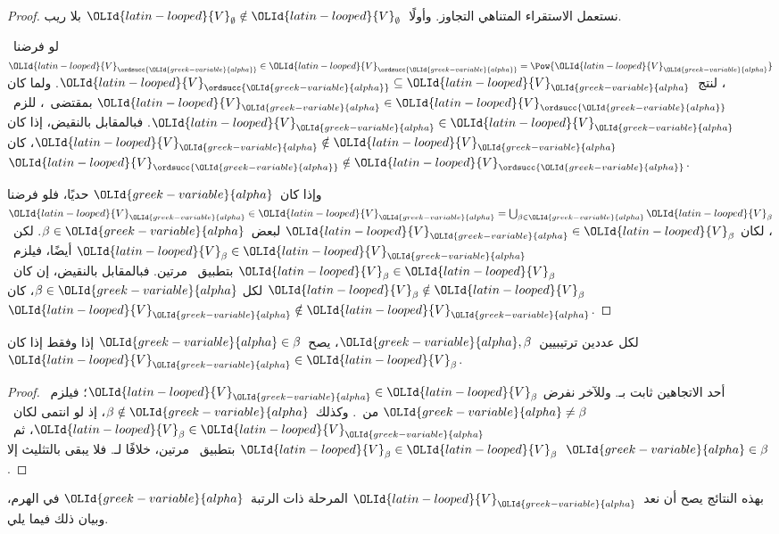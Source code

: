 \documentclass[../../../include/open-logic-section]{subfiles}
\begin{document}
\begin{proof}
نستعمل الاستقراء المتناهي التجاوز. وأولًا~$\OLId{latin-looped}{V}_\emptyset \notin \OLId{latin-looped}{V}_\emptyset$
بلا ريب.

لو فرضنا~$\OLId{latin-looped}{V}_{\ordsucc{\OLId{greek-variable}{alpha}}} \in \OLId{latin-looped}{V}_{\ordsucc{\OLId{greek-variable}{alpha}}} = \Pow{\OLId{latin-looped}{V}_\OLId{greek-variable}{alpha}}$،
لنتج~$\OLId{latin-looped}{V}_{\ordsucc{\OLId{greek-variable}{alpha}}} \subseteq \OLId{latin-looped}{V}_\OLId{greek-variable}{alpha}$. ولما كان
$\OLId{latin-looped}{V}_\OLId{greek-variable}{alpha} \in \OLId{latin-looped}{V}_{\ordsucc{\OLId{greek-variable}{alpha}}}$ بمقتضى~،
للزم~$\OLId{latin-looped}{V}_\OLId{greek-variable}{alpha} \in \OLId{latin-looped}{V}_\OLId{greek-variable}{alpha}$. فبالمقابل بالنقيض، إذا كان
$\OLId{latin-looped}{V}_\OLId{greek-variable}{alpha} \notin \OLId{latin-looped}{V}_\OLId{greek-variable}{alpha}$، كان~$\OLId{latin-looped}{V}_{\ordsucc{\OLId{greek-variable}{alpha}}} \notin \OLId{latin-looped}{V}_{\ordsucc{\OLId{greek-variable}{alpha}}}$.

وإذا كان~$\OLId{greek-variable}{alpha}$ حديًا، فلو فرضنا
$\OLId{latin-looped}{V}_\OLId{greek-variable}{alpha} \in \OLId{latin-looped}{V}_\OLId{greek-variable}{alpha} = \bigcup_{\beta \in \OLId{greek-variable}{alpha}}\OLId{latin-looped}{V}_\beta$، لكان
$\OLId{latin-looped}{V}_\OLId{greek-variable}{alpha} \in \OLId{latin-looped}{V}_\beta$ لبعض~$\beta \in \OLId{greek-variable}{alpha}$. لكن~$\OLId{latin-looped}{V}_\beta \in \OLId{latin-looped}{V}_\OLId{greek-variable}{alpha}$
أيضًا، فيلزم~$\OLId{latin-looped}{V}_\beta \in \OLId{latin-looped}{V}_\beta$ بتطبيق~
مرتين. فبالمقابل بالنقيض، إن كان~$\OLId{latin-looped}{V}_\beta \notin \OLId{latin-looped}{V}_\beta$ لكل
$\beta \in \OLId{greek-variable}{alpha}$، كان~$\OLId{latin-looped}{V}_\OLId{greek-variable}{alpha} \notin \OLId{latin-looped}{V}_\OLId{greek-variable}{alpha}$.
\end{proof}

\begin{cor}
لكل عددين ترتيبيين~$\OLId{greek-variable}{alpha}, \beta$، يصح~$\OLId{greek-variable}{alpha} \in \beta$ إذا
وفقط إذا كان~$\OLId{latin-looped}{V}_\OLId{greek-variable}{alpha} \in \OLId{latin-looped}{V}_\beta$.
\end{cor}

\begin{proof}
أحد الاتجاهين ثابت بـ. وللآخر نفرض
$\OLId{latin-looped}{V}_\OLId{greek-variable}{alpha} \in \OLId{latin-looped}{V}_\beta$؛ فيلزم~$\OLId{greek-variable}{alpha} \neq \beta$ من~.
وكذلك~$\beta \notin \OLId{greek-variable}{alpha}$، إذ لو انتمى لكان~$\OLId{latin-looped}{V}_\beta \in \OLId{latin-looped}{V}_\OLId{greek-variable}{alpha}$،
ثم~$\OLId{latin-looped}{V}_\beta \in \OLId{latin-looped}{V}_\beta$ بتطبيق~ مرتين،
خلافًا لـ. فلا يبقى بالتثليث إلا~$\OLId{greek-variable}{alpha} \in \beta$.
\end{proof}
\noindent
بهذه النتائج يصح أن نعد~$\OLId{latin-looped}{V}_\OLId{greek-variable}{alpha}$ المرحلة ذات الرتبة~$\OLId{greek-variable}{alpha}$
في الهرم، وبيان ذلك فيما يلي.
\end{document}
